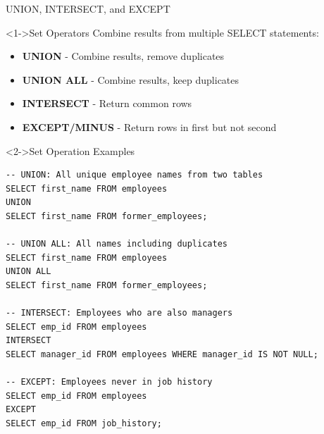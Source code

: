 \documentclass[aspectratio=169,11pt]{beamer}
\begin{document}
\begin{frame}[fragile]{UNION, INTERSECT, and EXCEPT}
\begin{block}<1->{Set Operators}
Combine results from multiple SELECT statements:
\begin{itemize}
    \item \textbf{UNION} - Combine results, remove duplicates
    \item \textbf{UNION ALL} - Combine results, keep duplicates
    \item \textbf{INTERSECT} - Return common rows
    \item \textbf{EXCEPT/MINUS} - Return rows in first but not second
\end{itemize}
\end{block}

\pause
\begin{exampleblock}<2->{Set Operation Examples}
\begin{lstlisting}
-- UNION: All unique employee names from two tables
SELECT first_name FROM employees
UNION
SELECT first_name FROM former_employees;

-- UNION ALL: All names including duplicates
SELECT first_name FROM employees
UNION ALL
SELECT first_name FROM former_employees;

-- INTERSECT: Employees who are also managers
SELECT emp_id FROM employees
INTERSECT
SELECT manager_id FROM employees WHERE manager_id IS NOT NULL;

-- EXCEPT: Employees never in job history
SELECT emp_id FROM employees
EXCEPT
SELECT emp_id FROM job_history;
\end{lstlisting}
\end{exampleblock}
\end{frame}
\end{document}
